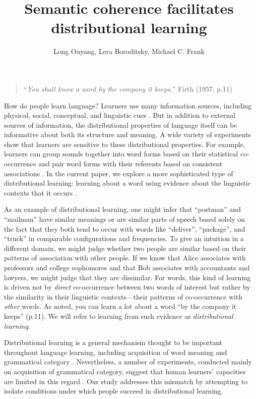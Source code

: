 \documentclass[man,floatsintext]{apa6}
\title{Semantic coherence facilitates distributional learning}
\author{Long Ouyang, Lera Boroditsky, Michael C. Frank}
\affiliation{Department of Psychology, Stanford University\vskip 5em Word count: 8,298}
\begin{document}
\maketitle

\begin{quote}
``\emph{You shall know a word by the company it keeps.}'' Firth (1957, p.11)
\end{quote}

How do people learn language? Learners use many information sources, including physical, social, conceptual, and linguistic cues \citep{clark1988, markman1991, gleitman1990, baldwin1993, hollich2000}. But in addition to external sources of information, the distributional properties of language itself can be informative about both its structure and meaning. A wide variety of experiments show that learners are sensitive to these distributional properties. For example, learners can group sounds together into word forms based on their statistical co-occurrence \citep{saffran1996a, saffran1996b} and pair word forms with their referents based on consistent associations \citep{yu2007,smith2008}. In the current paper, we explore a more sophisticated type of distributional learning: learning about a word using evidence about the linguistic contexts that it occurs \citep{smith1966, maratsos1980, braine1987, redington1998}.

As an example of distributional learning, one might infer that ``postman'' and ``mailman'' have similar meanings or are similar parts of speech based solely on the fact that they both tend to occur with words like ``deliver'', ``package'', and ``truck'' in comparable configurations and frequencies. To give an intuition in a different domain, we might judge whether two people are similar based on their patterns of association with other people. If we know that Alice associates with professors and college sophomores and that Bob associates with accountants and lawyers, we might judge that they are dissimilar. For words, this kind of learning is driven not by \emph{direct} co-occurrence between two words of interest but rather by the similarity in their linguistic contexts---their patterns of co-occurrence with \emph{other} words. As \citet{firth1957} noted, you can learn a lot about a word ``by the company it keeps'' (p.11). We will refer to learning from such evidence as \emph{distributional learning}.

Distributional learning is a general mechanism thought to be important throughout language learning, including acquisition of word meaning \citep{landauer1997} and grammatical category \citep{redington1998}. Nevertheless, a number of experiments, conducted mainly on acquisition of grammatical category, suggest that human learners' capacities are limited in this regard \citep{braine1987, brooks1993, frigo1998, kempe2001, gerken2005, frank2011}. Our study addresses this mismatch by attempting to isolate conditions under which people succeed in distributional learning.
\end{document}
